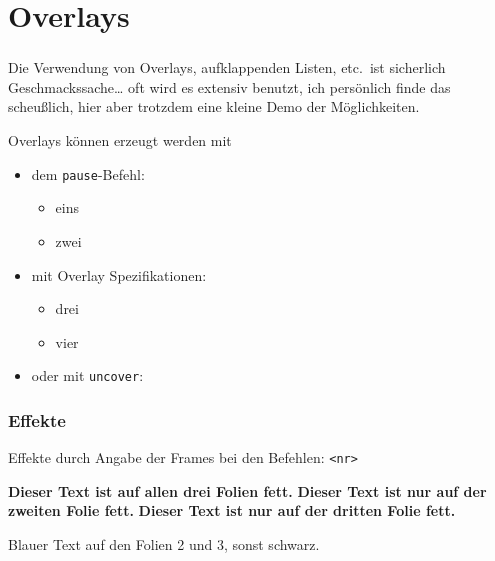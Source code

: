 \documentclass[usepdftitle=false, t]{beamer}
\begin{document}
\section{Overlays}			%

\begin{frame}
  \frametitle{\insertsection}
  Die Verwendung von Overlays, aufklappenden Listen, etc.\ ist sicherlich
  Geschmackssache\ldots{} oft wird es extensiv benutzt, ich persönlich finde
  das scheußlich, hier aber trotzdem eine kleine Demo der Möglichkeiten.\bvskip

  Overlays können erzeugt werden mit
  \begin{itemize}
  \item dem \texttt{pause}-Befehl:
    \begin{itemize}
    \item eins
      \pause
    \item zwei
    \end{itemize}
  \item
    mit Overlay Spezifikationen:
    \begin{itemize}
    \item<3-> drei
    \item<4-> vier
    \end{itemize}
  \item
    oder mit \texttt{uncover}:
    \begin{itemize}
    \end{itemize}
  \end{itemize}
\end{frame}

\begin{frame}
  \frametitle{Effekte}
  Effekte durch Angabe der Frames bei den Befehlen: \texttt{<nr>}\bvskip

  \textbf{Dieser Text ist auf allen drei Folien fett.}
  \textbf<2>{Dieser Text ist nur auf der zweiten Folie fett.}
  \textbf<3>{Dieser Text ist nur auf der dritten Folie fett.}


   Blauer Text auf den Folien 2 und 3, sonst schwarz.
\end{frame}
\end{document}
